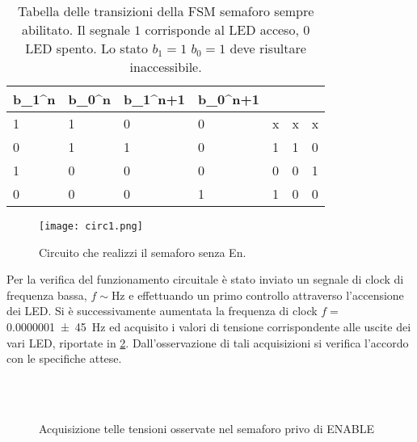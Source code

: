 \begin{table}[h]
\centering
\begin{tabular}{ss|ss|sss}
	\toprule
	b_{1}^{n} & b_{0}^{n}  & b_{1}^{n+1} & b_{0}^{n+1} &  &  &  \\
	 & 1 & 0 & 0 & x & x& x\\
	 0 & 1 & 1 & 0 & 1 & 1& 0\\
	 1 & 0 & 0 & 0 & 0 & 0& 1\\
	 0 & 0 & 0 & 1 & 1 & 0& 0\\
	\bottomrule
\end{tabular}
\caption{Tabella delle transizioni della FSM semaforo sempre abilitato.
Il segnale $1$ corrisponde al LED acceso, $0$ LED spento.
Lo stato $b_{1}=1$ $b_{0}=1$ deve risultare inaccessibile. }
\label{tab:tran}
\end{table}

\begin{figure}[h!]
		\centering
		\texttt{[image: circ1.png]}
		\caption{Circuito che realizzi il semaforo senza En.}
		\label{fig:sem1}
	\end{figure}

Per la verifica del funzionamento circuitale è stato
 inviato un segnale di clock di frequenza bassa, $f\sim $\si{\hertz} e effettuando un primo controllo attraverso l'accensione dei LED. Si è successivamente aumentata la frequenza di clock $f= $\SI{.0000001\pm 45}{\hertz}
 ed acquisito i valori di tensione corrispondente alle uscite dei vari LED, riportate in
 \figurename{ \ref{fig:acq}}. Dall'osservazione di
  tali acquisizioni si verifica l'accordo con le specifiche attese.

\begin{figure}[h]
	\centering
	\\
	\\
\caption{Acquisizione telle tensioni osservate nel semaforo privo di ENABLE}
\label{fig:acq}
\end{figure}

